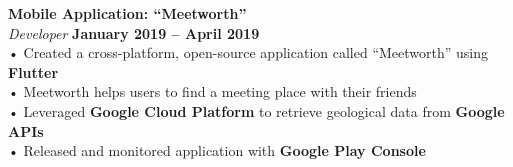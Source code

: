 \documentclass[margin,line]{resume}
\begin{document}
\begin{resume}
    \textbf{\listing Mobile Application: ``Meetworth''} \vspace{2mm}\\\vspace{1mm}%
    \textsl{Developer} \hfill \textbf{January 2019 -- April 2019}\\
    • Created a cross-platform, open-source application called “Meetworth” using \textbf{Flutter}\\
    • Meetworth helps users to find a meeting place with their friends\\
    • Leveraged \textbf{Google Cloud Platform} to retrieve geological data from \textbf{Google APIs}\\
    • Released and monitored application with \textbf{Google Play Console}
    \vspace{-1mm}

\end{resume}
\end{document}
